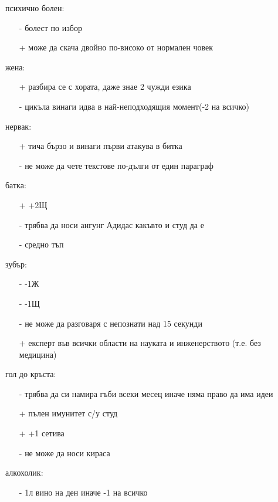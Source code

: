 \documentclass{article}
\begin{document}
психично болен:
\begin{itemize}
\item[-] болест по избор
\item[+] може да скача двойно по-високо от нормален човек
\end{itemize}

жена:
\begin{itemize}
\item[+] разбира се с хората, даже знае 2 чужди езика
\item[-] цикъла винаги идва в най-неподходящия момент(-2 на всичко)
\end{itemize}

нервак:
\begin{itemize}
\item[+] тича бързо и винаги първи атакува в битка
\item[-] не може да чете текстове по-дълги от един параграф
\end{itemize}

батка:
\begin{itemize}
\item[+] +2Щ
\item[-] трябва да носи ангунг Адидас какъвто и студ да е
\item[-] средно тъп
\end{itemize}

зубър:
\begin{itemize}
\item[-] -1Ж
\item[-] -1Щ
\item[-] не може да разговаря с непознати над 15 секунди
\item[+] експерт във всички области на науката и инженерството (т.е. без медицина)
\end{itemize}

гол до кръста:
\begin{itemize}
\item[-] трябва да си намира гъби всеки месец иначе няма право да има идеи
\item[+] пълен имунитет с/у студ
\item[+] +1 сетива
\item[-] не може да носи кираса
\end{itemize}

алкохолик:
\begin{itemize}
\item[-] 1л вино на ден иначе -1 на всичко
\end{itemize}
\end{document}
